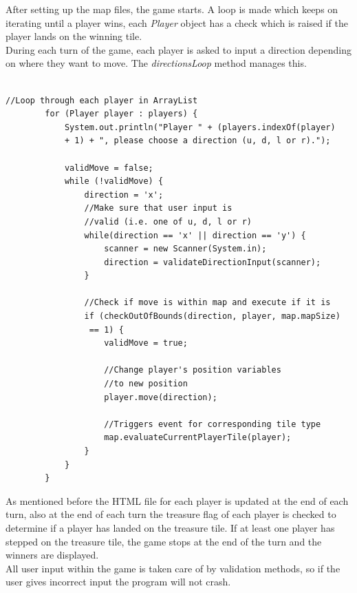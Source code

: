 \documentclass[a4paper,12pt]{extarticle}
\begin{document}
\newpage
\noindent After setting up the map files, the game starts. A loop is made which keeps on iterating until a player wins, each \textit{Player} object has a check which is raised if the player lands on the winning tile.\\

During each turn of the game, each player is asked to input a direction depending on where they want to move. The \textit{directionsLoop} method manages this.\\

\begin{lstlisting}

//Loop through each player in ArrayList
        for (Player player : players) {
            System.out.println("Player " + (players.indexOf(player) 
            + 1) + ", please choose a direction (u, d, l or r).");

            validMove = false;
            while (!validMove) {
                direction = 'x';
                //Make sure that user input is
                //valid (i.e. one of u, d, l or r)
                while(direction == 'x' || direction == 'y') {
                    scanner = new Scanner(System.in);
                    direction = validateDirectionInput(scanner);
                }

                //Check if move is within map and execute if it is
                if (checkOutOfBounds(direction, player, map.mapSize)
                 == 1) {
                    validMove = true;

                    //Change player's position variables 
                    //to new position
                    player.move(direction);

                    //Triggers event for corresponding tile type
                    map.evaluateCurrentPlayerTile(player);
                }
            }
        }

\end{lstlisting}
\vspace{4mm}

\noindent As mentioned before the HTML file for each player is updated at the end of each turn, also at the end of each turn the treasure flag of each player is checked to determine if a player has landed on the treasure tile. If at least one player has stepped on the treasure tile, the game stops at the end of the turn and the winners are displayed.\\

\noindent All user input within the game is taken care of by validation methods, so if the user gives incorrect input the program will not crash.\\
\newpage
\end{document}
